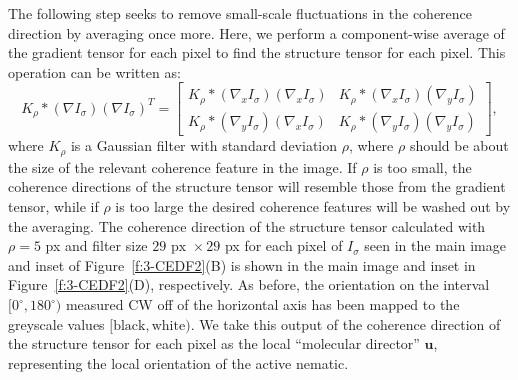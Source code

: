 The following step seeks to remove small-scale fluctuations in the coherence direction by averaging once more.
Here, we perform a component-wise average of the gradient tensor for each pixel to find the structure tensor for each pixel.
This operation can be written as:
\begin{equation}
K_{\rho} \ast (\nabla I_{\sigma})(\nabla I_{\sigma})^T =
\begin{bmatrix}
K_{\rho} \ast ( \nabla_x I_{\sigma})(\nabla_x I_{\sigma}) & K_{\rho} \ast (\nabla_x I_{\sigma})(\nabla_y I_{\sigma}) \\
K_{\rho} \ast (  \nabla_y I_{\sigma})(\nabla_x I_{\sigma}) & K_{\rho} \ast (\nabla_y I_{\sigma})(\nabla_y I_{\sigma})
\end{bmatrix},
\end{equation}
where $K_{\rho}$ is a Gaussian filter with standard deviation $\rho$, where $\rho$ should be about the size of the relevant coherence feature in the image.
If $\rho$ is too small, the coherence directions of the structure tensor will resemble those from the gradient tensor, while if $\rho$ is too large the desired coherence features will be washed out by the averaging.
The coherence direction of the structure tensor calculated with $\rho = 5$ px and filter size $29\textrm{ px } \times 29$ px for each pixel of $I_{\sigma}$ seen in the main image and inset of Figure~\ref{f:3-CEDF2}(B) is shown in the main image and inset in Figure~\ref{f:3-CEDF2}(D), respectively.
As before, the orientation on the interval $[0^{\circ}, 180^{\circ})$ measured CW off of the horizontal axis has been mapped to the greyscale values $[\textrm{black}, \textrm{white})$.
 We take this output of the coherence direction of the structure tensor for each pixel as the local ``molecular director'' $\mathbf{u}$, representing the local orientation of the active nematic.
\newpage
